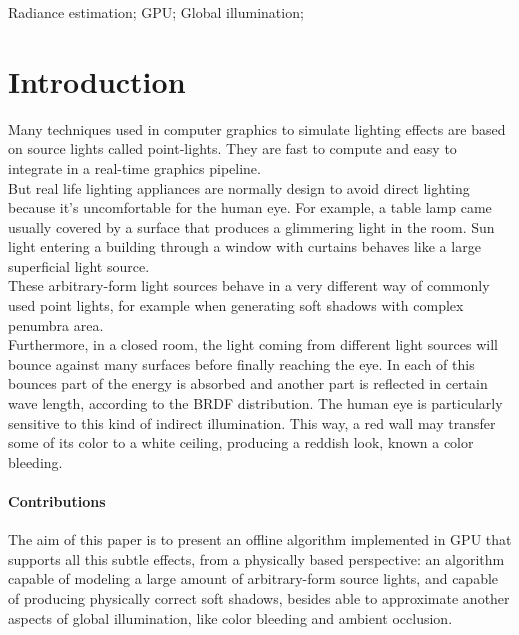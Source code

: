 \documentclass[10pt, conference]{IEEEtran}
\begin{document}
\begin{IEEEkeywords}
Radiance estimation; GPU; Global illumination;
\end{IEEEkeywords}


\IEEEpeerreviewmaketitle





\section{Introduction}
%
Many techniques used in computer graphics to simulate lighting effects are based on source lights called point-lights. 
They are fast to compute and easy to integrate in a real-time graphics pipeline.\\

But real life lighting appliances are normally design to avoid direct lighting because it’s uncomfortable for the human eye. 
For example, a table lamp came usually covered by a surface that produces a glimmering light in the room. 
Sun light entering a building through a window with curtains behaves like a large superficial light source.\\

These arbitrary-form light sources behave in a very different way of commonly used point lights, 
for example when generating soft shadows with complex penumbra area.\\

Furthermore, in a closed room, the light coming from different light sources will bounce against many surfaces before finally reaching the eye. 
In each of this bounces part of the energy is absorbed and another part is reflected in certain wave length, 
according to the BRDF \cite{brdf} distribution. The human eye is particularly sensitive to this kind of indirect illumination. 
This way, a red wall may transfer some of its color to a white ceiling, producing a reddish look, known a color bleeding.\\


\paragraph*{Contributions}
%
The aim of this paper is to present an offline algorithm implemented in GPU that supports all this subtle effects, 
from a physically based perspective: an algorithm capable of modeling a large amount of arbitrary-form source lights, 
and capable of producing physically correct soft shadows,  besides able to approximate another aspects of global illumination, 
like color bleeding and ambient occlusion. 
\end{document}
